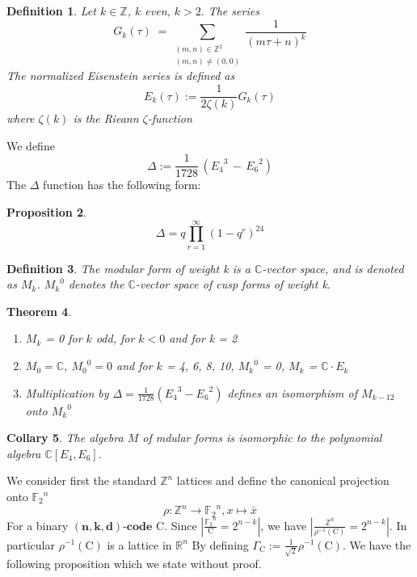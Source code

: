 \documentclass{article}
\newtheorem{theorem}{Theorem}[section]
\newtheorem{definition}[theorem]{Definition}
\newtheorem{collary}[theorem]{Collary}
\newtheorem{prop}[theorem]{Proposition}
\numberwithin{equation}{theorem}
\numberwithin{figure}{theorem}
\newcommand{\Ftwo}{\ensuremath{\mathbb{F}_2}}
\newcommand{\simpleCodes}{\ensuremath{\mathrm{C}}}
\newcommand{\modularK}[1]{\ensuremath{M_{#1}}}
\newcommand{\eisenSeries}[1]{\ensuremath{E_{#1}}}
\newcommand{\linearCode}[3]{\ensuremath{\bm{(#1,#2,#3)\mbox{-}code}}}
\newcommand{\Integer}{\ensuremath{\mathbb{Z}}}
\newcommand{\Real}{\ensuremath{\mathbb{R}}}
\newcommand{\Complex}{\ensuremath{\mathbb{C}}}
\begin{document}
\begin{definition}
Let $k \in \Integer$, $k$ even, $k > 2.$ The series
\[
	G_k(\tau) \; = \sum_{\substack{(m,n) \in \Integer^2\\				 (m,n) \neq (0,0)}} \frac{1}{(m\tau + n)^k}
\]
The \emph{normalized Eisenstein series} is defined as
\[
	\eisenSeries{k}(\tau) := \frac{1}{2\zeta(k)} G_k(\tau)
\]
where $\zeta(k)$ is the \emph{Rieann $\zeta$-function}
\end{definition}
We define
\[
	\Delta := \frac{1}{1728}\,(\eisenSeries{4}^3 \, - \, \eisenSeries{6}^2) 
\]
The $\Delta$ function has the following form:
\begin{prop}\label{deltaExpansionProp}
\[
	\Delta = q \prod_{r = 1}^{\infty}(1 - q^r)^{24}
\]
\end{prop}
\begin{definition}
	The modular form of weight k is a $\Complex$-vector space, and is denoted as {\modularK{k}}. $\modularK{k}^0$ denotes the $\Complex$-vector space of cusp forms of weight k.
\end{definition}
\begin{theorem}\label{cuspFormTheo}\hfill
\begin{enumerate}
	\item $\modularK{k}$ = 0 for $k$ odd, for $k < 0$ and for k = 2
	\item $\modularK{0} = \Complex$, $\modularK{0}^0 = 0$ and for $k$ = 4, 6, 8, 10, $\modularK{k}^0 $ = 0, $\modularK{k}$ = $\Complex \cdot \eisenSeries{k}$\
	\item Multiplication by $\Delta = \frac{1}{1728}(\eisenSeries{4}^3 -\eisenSeries{6}^2)$ defines an isomorphism of $\modularK{k-12}$ onto $\modularK{k}^0$
\end{enumerate}
\end{theorem}
\begin{collary}\label{E4E6collary}
The algebra $M$ of mdular forms is isomorphic to the polynomial algebra $\Complex[{\eisenSeries{4}}, {\eisenSeries{6}}]$.
\end{collary}
We consider first the standard $\Integer^{n}$ lattices and define the canonical projection onto $\Ftwo^{n}$
\[
	\rho: \Integer^n \rightarrow \Ftwo^{n}, x \mapsto \bar{x}
\]
For a binary {\linearCode{n}{k}{d}} {\simpleCodes}. Since $|\frac{\Ftwo^n}{\simpleCodes} = 2^{n-k}|$, we have $|\frac{\Integer^{n}}{\rho^{-1}(\simpleCodes)} = 2^{n-k}|$. In particular $\rho^{-1}(\simpleCodes)$ is a lattice in $\Real^n$
By defining $\Gamma_{\simpleCodes} := \frac{1}{\sqrt{2}}\rho^{-1}(\simpleCodes)$. We have the following proposition which we state without proof.
\end{document}
